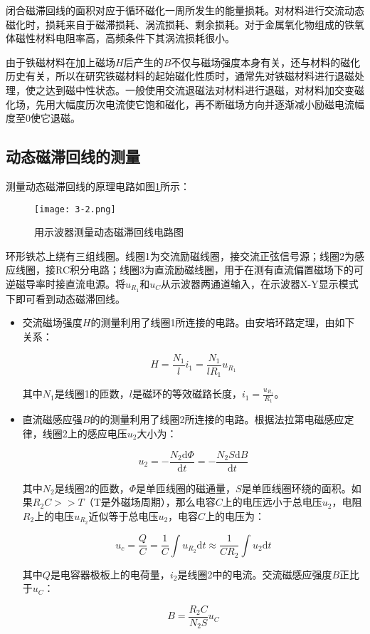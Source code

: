 \documentclass[12pt]{article}
\begin{document}
闭合磁滞回线的面积对应于循环磁化一周所发生的能量损耗。对材料进行交流动态磁化时，损耗来自于磁滞损耗、涡流损耗、剩余损耗。对于金属氧化物组成的铁氧体磁性材料电阻率高，高频条件下其涡流损耗很小。

由于铁磁材料在加上磁场$ H $后产生的$ B $不仅与磁场强度本身有关，还与材料的磁化历史有关，所以在研究铁磁材料的起始磁化性质时，通常先对铁磁材料进行退磁处理，使之达到磁中性状态。一般使用交流退磁法对材料进行退磁，对材料加交变磁化场，先用大幅度历次电流使它饱和磁化，再不断磁场方向并逐渐减小励磁电流幅度至0使它退磁。

\subsection{动态磁滞回线的测量}

测量动态磁滞回线的原理电路如图\ref{fig:2}所示：

\begin{figure}[htbp]
    \centering
    \texttt{[image: 3-2.png]}
    \caption{用示波器测量动态磁滞回线电路图}
    \label{fig:2}
\end{figure}

环形铁芯上绕有三组线圈。线圈1为交流励磁线圈，接交流正弦信号源；线圈2为感应线圈，接RC积分电路；线圈3为直流励磁线圈，用于在测有直流偏置磁场下的可逆磁导率时接直流电源。将$ u_{R_1} $和$ u_C $从示波器两通道输入，在示波器X-Y显示模式下即可看到动态磁滞回线。

\begin{itemize}
    \item 交流磁场强度$H$的测量利用了线圈1所连接的电路。由安培环路定理，由如下关系：
    
    \[
        H=\frac{N_1}{l}i_1=\frac{N_1}{lR_1}u_{R_1}
    \]

    其中$N_1$是线圈1的匝数，$l$是磁环的等效磁路长度，$i_1=\frac{u_{R_1}}{R_1}$。
    \item 直流磁感应强$B$的的测量利用了线圈2所连接的电路。根据法拉第电磁感应定律，线圈2上的感应电压$u_2$大小为：
    
    \[
        u_2=-\frac{N_2\mathrm{d}\Phi}{\mathrm{d}t}=-\frac{N_2S\mathrm{d}B}{\mathrm{d}t}
    \]

    其中$N_2$是线圈2的匝数，$\Phi$是单匝线圈的磁通量，$S$是单匝线圈环绕的面积。如果$R_2C>>T$（T是外磁场周期），那么电容$C$上的电压远小于总电压$u_2$，电阻$R_2$上的电压$u_{R_{2}}$近似等于总电压$u_2$，电容$C$上的电压为：

    \[
        u_c=\frac{Q}{C}=\frac{1}{C}\int u_{R_{2}}\mathrm{d}t\approx\frac{1}{CR_2}\int u_2 \mathrm{d}t
    \]

    其中$Q$是电容器极板上的电荷量，$i_2$是线圈2中的电流。交流磁感应强度$B$正比于$u_C$：

    \[
        B=\frac{R_2C}{N_2S}u_C
    \]

\end{itemize}
\end{document}
